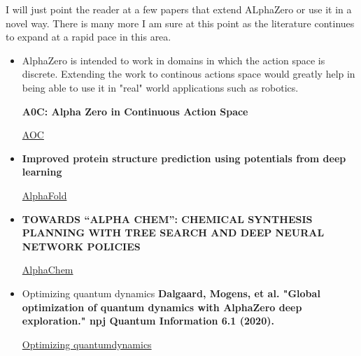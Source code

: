 I will just point the reader at a few papers that extend ALphaZero or use it in a novel way. There is many more I am sure at this point as the literature continues to expand at a rapid pace in this area. 

\begin{itemize}
    \item AlphaZero is intended to work in domains in which the action space is discrete. Extending the work to continous actions space would greatly help in being able to use it in "real" world applications such as robotics. 
    
    \textbf{A0C: Alpha Zero in Continuous Action Space}
    
    \href{https://arxiv.org/pdf/1805.09613.pdf}{AOC}
    
    
    \item \textbf{Improved protein structure prediction using potentials from deep learning}
    
    \href{https://www.nature.com/articles/s41586-019-1923-7}{AlphaFold}
    
    \item \textbf{TOWARDS “ALPHA CHEM”: CHEMICAL SYNTHESIS PLANNING WITH TREE SEARCH AND
    DEEP NEURAL NETWORK POLICIES}
    
    \href{https://arxiv.org/pdf/1702.00020.pdf}{AlphaChem}
    
    \item Optimizing quantum dynamics
    \textbf{Dalgaard, Mogens, et al. "Global optimization of quantum dynamics with AlphaZero deep exploration." npj Quantum Information 6.1 (2020).}
    
    \href{https://www.nature.com/articles/s41534-019-0241-0.pdf?origin=ppub}{Optimizing quantumdynamics}
    
\end{itemize}

